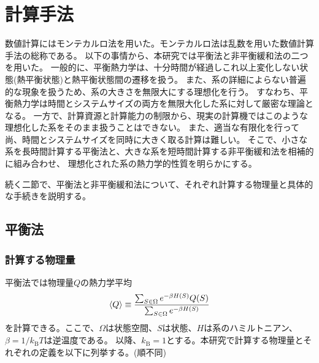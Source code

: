 \documentclass[12pt,titlepage,dvipdfmx]{jarticle}
\begin{document}
\newpage

\section{計算手法}
数値計算にはモンテカルロ法を用いた。モンテカルロ法は乱数を用いた数値計算手法の総称である。
以下の事情から、本研究では平衡法と非平衡緩和法の二つを用いた。
一般的に、平衡熱力学は、十分時間が経過しこれ以上変化しない状態(熱平衡状態)と熱平衡状態間の遷移を扱う。
また、系の詳細によらない普遍的な現象を扱うため、系の大きさを無限大にする理想化を行う。
すなわち、平衡熱力学は時間とシステムサイズの両方を無限大化した系に対して厳密な理論となる。
一方で、計算資源と計算能力の制限から、現実の計算機ではこのような理想化した系をそのまま扱うことはできない。
また、適当な有限化を行って尚、時間とシステムサイズを同時に大きく取る計算は難しい。
そこで、小さな系を長時間計算する平衡法と、大きな系を短時間計算する非平衡緩和法を相補的に組み合わせ、
理想化された系の熱力学的性質を明らかにする。

続く二節で、平衡法と非平衡緩和法について、それぞれ計算する物理量と具体的な手続きを説明する。

\subsection{平衡法}
\subsubsection{計算する物理量}

平衡法では物理量$Q$の熱力学平均
\begin{align}
   \ev{Q} \equiv \frac{\sum_{S\in\Omega}e^{-\beta H(S)}Q(S)}{\sum_{S\in\Omega}e^{-\beta H(S)}}
\end{align}
を計算できる。ここで、$\Omega$は状態空間、$S$は状態、$H$は系のハミルトニアン、$\beta=1/k_{\mathrm{B}}T$は逆温度である。
以降、$k_{\mathrm{B}}=1$とする。本研究で計算する物理量とそれぞれの定義を以下に列挙する。(順不同)
\end{document}
